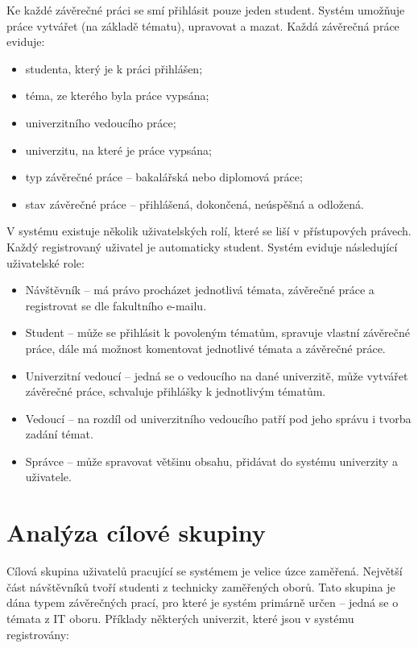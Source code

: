 Ke každé závěrečné práci se smí přihlásit pouze jeden student. Systém umožňuje práce vytvářet (na základě tématu), upravovat a mazat. Každá závěrečná práce eviduje:

\begin{itemize}
    \item studenta, který je k práci přihlášen;
    \item téma, ze kterého byla práce vypsána;
    \item univerzitního vedoucího práce;
    \item univerzitu, na které je práce vypsána;
    \item typ závěrečné práce -- bakalářská nebo diplomová práce;
    \item stav závěrečné práce -- přihlášená, dokončená, neúspěšná a odložená.
\end{itemize}

V systému existuje několik uživatelských rolí, které se liší v přístupových právech. Každý registrovaný uživatel je automaticky student. Systém eviduje následující uživatelské role:

\begin{itemize}
    \item Návštěvník -- má právo procházet jednotlivá témata, závěrečné práce a registrovat se dle fakultního e-mailu.
    \item Student -- může se přihlásit k povoleným tématům, spravuje vlastní závěrečné práce, dále má možnost komentovat jednotlivé témata a závěrečné práce.
    \item Univerzitní vedoucí -- jedná se o vedoucího na dané univerzitě, může vytvářet závěrečné práce, schvaluje přihlášky k jednotlivým tématům.
    \item Vedoucí -- na rozdíl od univerzitního vedoucího patří pod jeho správu i tvorba zadání témat.
    \item Správce -- může spravovat většinu obsahu, přidávat do systému univerzity a uživatele.
\end{itemize}

\section{Analýza cílové skupiny}

Cílová skupina uživatelů pracující se systémem je velice úzce zaměřená. Největší část návštěvníků tvoří studenti z technicky zaměřených oborů. Tato skupina je dána typem závěrečných prací, pro které je systém primárně určen -- jedná se o témata z IT oboru. Příklady některých univerzit, které jsou v systému registrovány:

